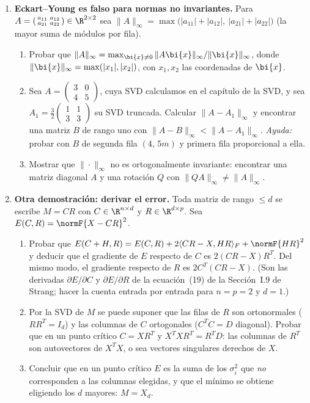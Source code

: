 \begin{enumerate}[leftmargin=*,label=\textbf{\thechapter.\arabic*},ref=\thechapter.\arabic*,itemsep=4pt]
\item {} \textbf{Eckart--Young es falso para normas no
invariantes.}\label{pca-ej:norma-inf} Para
$A=\left(\begin{smallmatrix}a_{11}&a_{12}\\a_{21}&a_{22}\end{smallmatrix}\right)\in\R^{2\times2}$
sea $\|A\|_\infty=\max\bigl(|a_{11}|+|a_{12}|,\ |a_{21}|+|a_{22}|\bigr)$ (la
mayor suma de módulos por fila).
\begin{enumerate}[label=(\alph*)]
\item Probar que $\|A\|_\infty=\max_{\bi{x}\ne0}\|A\bi{x}\|_\infty/\|\bi{x}\|_\infty$, donde
$\|\bi{x}\|_\infty=\max(|x_1|,|x_2|)$, con $x_1,x_2$ las coordenadas de $\bi{x}$.
\item Sea $A=\left(\begin{smallmatrix}3&0\\4&5\end{smallmatrix}\right)$, cuya
SVD calculamos en el capítulo de la SVD, y sea
$A_1=\frac32\left(\begin{smallmatrix}1&1\\3&3\end{smallmatrix}\right)$ su
SVD truncada. Calcular $\|A-A_1\|_\infty$ y encontrar una matriz $B$ de rango
uno con $\|A-B\|_\infty<\|A-A_1\|_\infty$. \emph{Ayuda:} probar con $B$ de
segunda fila $(4,\,5m)$ y primera fila proporcional a ella.
\item Mostrar que $\|\cdot\|_\infty$ no es ortogonalmente invariante:
encontrar una matriz diagonal $A$ y una rotación $Q$ con
$\|QA\|_\infty\ne\|A\|_\infty$.
\end{enumerate}

\item {} \textbf{Otra demostración: derivar el error.}\label{pca-ej:srebro}
Toda matriz de rango $\le d$ se escribe $M=CR$ con $C\in\R^{n\times d}$ y
$R\in\R^{d\times p}$. Sea $E(C,R)=\normF{X-CR}^2$.
\begin{enumerate}[label=(\alph*)]
\item Probar que $E(C+H,R)=E(C,R)+2\langle CR-X,HR\rangle_F+\normF{HR}^2$ y
deducir que el gradiente de $E$ respecto de $C$ es $2(CR-X)R^T$. Del
mismo modo, el gradiente respecto de $R$ es $2C^T(CR-X)$. (Son las
derivadas $\partial E/\partial C$ y $\partial E/\partial R$ de la
ecuación~(19) de la Sección~I.9 de Strang; hacer la cuenta entrada por
entrada para $n=p=2$ y $d=1$.)
\item Por la SVD de $M$ se puede suponer que las filas de $R$ son
ortonormales ($RR^T=I_d$) y las columnas de $C$ ortogonales
($C^T C=D$ diagonal). Probar que en un punto crítico $C=XR^T$ y
$X^T XR^T=R^T D$: las columnas de $R^T$ son autovectores
de $X^T X$, o sea vectores singulares derechos de $X$.
\item Concluir que en un punto crítico $E$ es la suma de los $\sigma_i^2$ que
\emph{no} corresponden a las columnas elegidas, y que el mínimo se obtiene
eligiendo los $d$ mayores: $M=X_d$.
\end{enumerate}


\end{enumerate}
